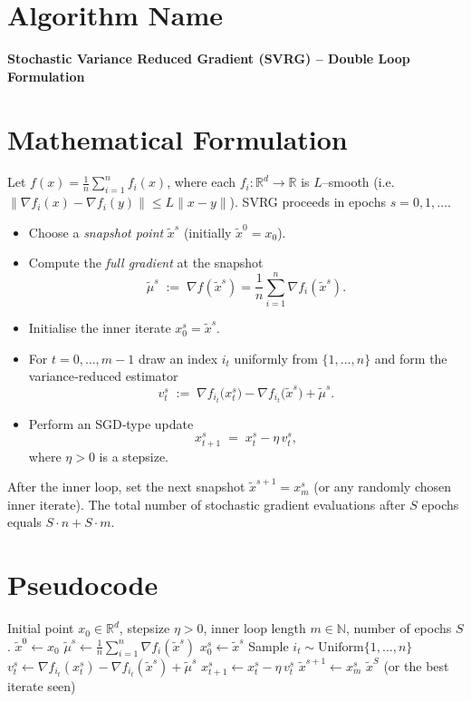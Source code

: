 \documentclass{article}
\begin{document}
\section*{Algorithm Name}
\textbf{Stochastic Variance Reduced Gradient (SVRG) – Double Loop Formulation}

\section*{Mathematical Formulation}
Let $f(x)=\frac{1}{n}\sum_{i=1}^{n} f_i(x)$, where each $f_i:\mathbb{R}^d\rightarrow\mathbb{R}$ is $L$–smooth (i.e. $\|\nabla f_i(x)-\nabla f_i(y)\|\le L\|x-y\|$).  
SVRG proceeds in epochs $s=0,1,\dots$.
\begin{itemize}
    \item Choose a \emph{snapshot point} $\tilde{x}^{s}$ (initially $\tilde{x}^{0}=x_0$).
    \item Compute the \emph{full gradient} at the snapshot
    \[
        \tilde{\mu}^{s}\;:=\;\nabla f(\tilde{x}^{s})=\frac{1}{n}\sum_{i=1}^{n}\nabla f_i(\tilde{x}^{s}).
    \]
    \item Initialise the inner iterate $x_{0}^{s}= \tilde{x}^{s}$.
    \item For $t=0,\dots,m-1$ draw an index $i_t$ uniformly from $\{1,\dots,n\}$ and form the variance‑reduced estimator
    \[
        v_{t}^{s}\;:=\;\nabla f_{i_t}\!\big(x_{t}^{s}\big)-\nabla f_{i_t}\!\big(\tilde{x}^{s}\big)+\tilde{\mu}^{s}.
    \]
    \item Perform an SGD‑type update
    \[
        x_{t+1}^{s}\;=\;x_{t}^{s}-\eta\, v_{t}^{s},
    \]
    where $\eta>0$ is a stepsize.
\end{itemize}
After the inner loop, set the next snapshot $\tilde{x}^{s+1}=x_{m}^{s}$ (or any randomly chosen inner iterate).  
The total number of stochastic gradient evaluations after $S$ epochs equals $S\cdot n+S\cdot m$.

\section*{Pseudocode}
\begin{algorithm}[H]
\caption{SVRG (double‑loop)}\label{alg:svrg}
\begin{algorithmic}[1]
\Require Initial point $x_0\in\mathbb{R}^d$, stepsize $\eta>0$, inner loop length $m\in\mathbb{N}$, number of epochs $S$.
\State $\tilde{x}^{0}\gets x_0$
    \State $\displaystyle \tilde{\mu}^{s}\gets \frac{1}{n}\sum_{i=1}^{n}\nabla f_i(\tilde{x}^{s})$ 
    \State $x_{0}^{s}\gets \tilde{x}^{s}$
        \State Sample $i_t\sim\text{Uniform}\{1,\dots,n\}$
        \State $v_{t}^{s}\gets \nabla f_{i_t}(x_{t}^{s})-\nabla f_{i_t}(\tilde{x}^{s})+\tilde{\mu}^{s}$
        \State $x_{t+1}^{s}\gets x_{t}^{s}-\eta\, v_{t}^{s}$
    \EndFor
    \State $\tilde{x}^{s+1}\gets x_{m}^{s}$ 
\EndFor
\State \Return $\tilde{x}^{S}$ (or the best iterate seen)
\end{algorithmic}
\end{algorithm}
\end{document}
